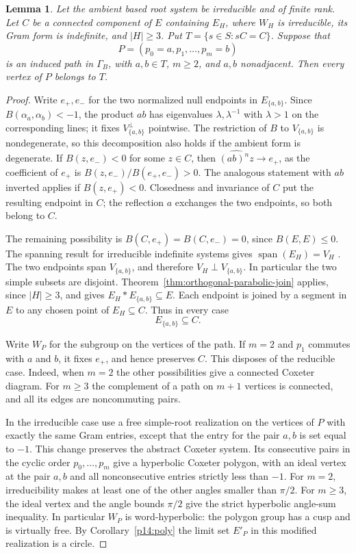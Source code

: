 \documentclass[11pt,reqno]{amsart}
\theoremstyle{plain}
\newtheorem{lemma}[theorem]{Lemma}
\theoremstyle{definition}
\theoremstyle{remark}
\numberwithin{equation}{section}
\begin{document}
\begin{lemma}\label{p14:lem:induced-ear}
Let the ambient based root system be irreducible and of finite rank.
Let $C$ be a connected component of $E$ containing $E_H$, where
$W_H$ is irreducible, its Gram form is indefinite, and $|H|\geq3$.
Put $T=\{s\in S:sC=C\}$. Suppose that
\[
       P=(p_0=a,p_1,\ldots,p_m=b)
\]
is an induced path in $\Gamma_B$, with $a,b\in T$, $m\geq2$,
and $a,b$ nonadjacent. Then every vertex of $P$ belongs to $T$.
\end{lemma}

\begin{proof}
Write $e_+,e_-$ for the two normalized null endpoints in
$E_{\{a,b\}}$. Since $B(\alpha_a,\alpha_b)<-1$, the product $ab$
has eigenvalues $\lambda,\lambda^{-1}$ with $\lambda>1$ on the
corresponding lines; it fixes $V_{\{a,b\}}^\perp$ pointwise.
The restriction of $B$ to $V_{\{a,b\}}$ is nondegenerate, so this
decomposition also holds if the ambient form is degenerate.
If $B(z,e_-)<0$ for some $z\in C$, then $\widehat{(ab)^nz}\to e_+$,
as the coefficient of $e_+$ is $B(z,e_-)/B(e_+,e_-)>0$.
The analogous statement with $ab$ inverted applies if $B(z,e_+)<0$.
Closedness and invariance of $C$ put the resulting endpoint in $C$;
the reflection $a$ exchanges the two endpoints, so both belong to $C$.

The remaining possibility is $B(C,e_+)=B(C,e_-)=0$, since
$B(E,E)\leq0$. The spanning result for irreducible indefinite
systems gives $\operatorname{span}(E_H)=V_H$ \cite{DHR}. The two
endpoints span $V_{\{a,b\}}$, and therefore
$V_H\perp V_{\{a,b\}}$. In particular the two simple subsets
are disjoint. Theorem~\ref{thm:orthogonal-parabolic-join} applies, since $|H|\geq3$, and gives
$E_H*E_{\{a,b\}}\subseteq E$. Each endpoint is joined by a segment
in $E$ to any chosen point of $E_H\subseteq C$. Thus in every case
\[
                         E_{\{a,b\}}\subseteq C .
\]

Write $W_P$ for the subgroup on the vertices of the path. If $m=2$
and $p_1$ commutes with $a$ and $b$, it fixes $e_+$, and hence
preserves $C$. This disposes of the reducible case. Indeed, when
$m=2$ the other possibilities give a connected Coxeter diagram.
For $m\geq3$ the complement of a path on $m+1$ vertices is connected,
and all its edges are noncommuting pairs.

In the irreducible case use a free simple-root realization on the
vertices of $P$ with exactly the same Gram entries, except that the
entry for the pair $a,b$ is set equal to $-1$. This change preserves
the abstract Coxeter system. Its consecutive pairs in the cyclic order
$p_0,\ldots,p_m$ give a hyperbolic Coxeter polygon, with an ideal
vertex at the pair $a,b$ and all nonconsecutive entries strictly
less than $-1$. For $m=2$, irreducibility makes at least one of
the other angles smaller than $\pi/2$. For $m\geq3$, the ideal
vertex and the angle bounds $\pi/2$ give the strict hyperbolic
angle-sum inequality. In particular $W_P$ is word-hyperbolic:
the polygon group has a cusp and is virtually free.
By Corollary~\ref{p14:poly} the limit set $E'_P$ in this
modified realization is a circle.


\end{proof}
\end{document}
